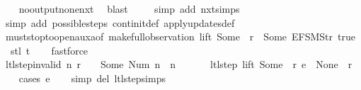 \begin{isabellebody}
\ \ \isamarkupfalse%
\ no{\isacharunderscore}output{\isacharunderscore}none{\isacharunderscore}nxt\ \isamarkupfalse%
\ blast\isanewline
\ \ \ \isamarkupfalse%
\ {\isacharparenleft}simp\ add{\isacharcolon}\ nxt{\isachardot}simps{\isacharparenright}\isanewline
\ \ \isamarkupfalse%
\ {\isacharparenleft}simp\ add{\isacharcolon}\ possible{\isacharunderscore}steps{\isacharunderscore}{}\ continit{\isacharunderscore}def\ apply{\isacharunderscore}updates{\isacharunderscore}def{\isacharparenright}\isanewline
\ \ \isamarkupfalse%
\ must{\isacharunderscore}stop{\isacharunderscore}to{\isacharunderscore}open{\isacharunderscore}aux{}a{\isacharbrackleft}of\ {\isachardoublequoteopen}{\isacharparenleft}make{\isacharunderscore}full{\isacharunderscore}observation\ lift\ {\isacharparenleft}Some\ {}{\isacharparenright}\ {\isacharparenleft}r{\isacharparenleft}{}\ {\isachardollar}{\isacharcolon}{\isacharequal}\ Some\ {\isacharparenleft}EFSM{\isachardot}Str\ {\isacharprime}{\isacharprime}true{\isacharprime}{\isacharprime}{\isacharparenright}{\isacharparenright}{\isacharparenright}\ {\isacharbrackleft}{\isacharbrackright}\ {\isacharparenleft}stl\ t{\isacharparenright}{\isacharparenright}{\isachardoublequoteclose}{\isacharbrackright}\isanewline
\ \ \isamarkupfalse%
\ fastforce%
\endisatagproof
{\isafoldproof}%
%
\isadelimproof
\isanewline
%
\endisadelimproof
\isanewline
{}\isamarkupfalse%
\ ltl{\isacharunderscore}step{\isacharunderscore}{}{\isacharunderscore}invalid{\isacharcolon}\ {\isachardoublequoteopen}{\isasymnot}{\isacharparenleft}{\isasymexists}n{\isachardot}\ r\ {\isachardollar}\ {}\ {\isacharequal}\ Some\ {\isacharparenleft}Num\ n{\isacharparenright}\ {\isasymand}\ n\ {\isasymin}\ {\isacharbraceleft}{}{\isacharcomma}\ {}{\isacharcomma}\ {}{\isacharcomma}\ {}{\isacharbraceright}{\isacharparenright}\ {\isasymLongrightarrow}\ ltl{\isacharunderscore}step\ lift\ {\isacharparenleft}Some\ {}{\isacharparenright}\ r\ e\ {\isacharequal}\ {\isacharparenleft}None{\isacharcomma}\ {\isacharbrackleft}{\isacharbrackright}{\isacharcomma}\ r{\isacharparenright}{\isachardoublequoteclose}\isanewline
%
\isadelimproof
\ \ %
\endisadelimproof
%
\isatagproof
{}\isamarkupfalse%
\ {\isacharparenleft}cases\ e{\isacharparenright}\isanewline
\ \ \isamarkupfalse%
\ {\isacharparenleft}simp\ del{\isacharcolon}\ ltl{\isacharunderscore}step{\isachardot}simps{\isacharparenright}\isanewline

\end{isabellebody}
